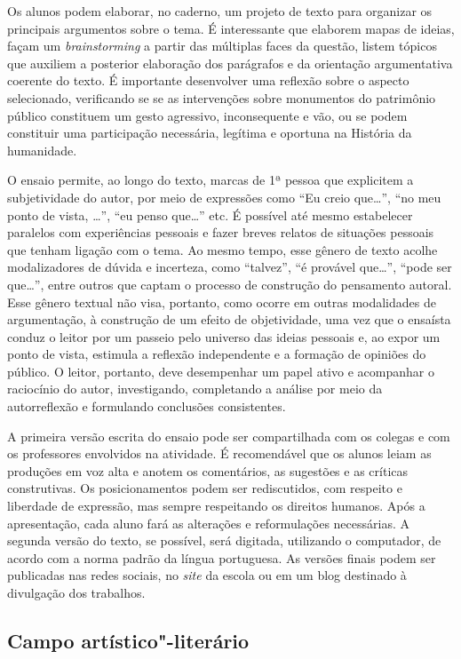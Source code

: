 \documentclass[11pt]{extarticle}
\begin{document}
Os alunos podem elaborar, no caderno, um projeto de texto para organizar
os principais argumentos sobre o tema. É interessante que elaborem mapas
de ideias, façam um \emph{brainstorming} a partir das múltiplas faces da
questão, listem tópicos que auxiliem a posterior elaboração dos
parágrafos e da orientação argumentativa coerente do texto. É importante
desenvolver uma reflexão sobre o aspecto selecionado, verificando se se
as intervenções sobre monumentos do patrimônio público constituem um
gesto agressivo, inconsequente e vão, ou se podem constituir uma
participação necessária, legítima e oportuna na História da humanidade.

O ensaio permite, ao longo do texto, marcas de 1ª pessoa que explicitem
a subjetividade do autor, por meio de expressões como ``Eu creio
que\ldots{}'', ``no meu ponto de vista, \ldots{}'', ``eu penso que\ldots{}'' etc. É
possível até mesmo estabelecer paralelos com experiências pessoais e
fazer breves relatos de situações pessoais que tenham ligação com o
tema. Ao mesmo tempo, esse gênero de texto acolhe modalizadores de
dúvida e incerteza, como ``talvez'', ``é provável que\ldots{}'', ``pode ser
que\ldots{}'', entre outros que captam o processo de construção do pensamento
autoral. Esse gênero textual não visa, portanto, como ocorre em outras
modalidades de argumentação, à construção de um efeito de objetividade,
uma vez que o ensaísta conduz o leitor por um passeio pelo universo das
ideias pessoais e, ao expor um ponto de vista, estimula a reflexão
independente e a formação de opiniões do público. O leitor, portanto,
deve desempenhar um papel ativo e acompanhar o raciocínio do autor,
investigando, completando a análise por meio da autorreflexão e
formulando conclusões consistentes.

A primeira versão escrita do ensaio pode ser compartilhada com os
colegas e com os professores envolvidos na atividade. É recomendável que
os alunos leiam as produções em voz alta e anotem os comentários, as
sugestões e as críticas construtivas. Os posicionamentos podem ser
rediscutidos, com respeito e liberdade de expressão, mas sempre
respeitando os direitos humanos. Após a apresentação, cada aluno fará as
alterações e reformulações necessárias. A segunda versão do texto, se possível, 
será digitada, utilizando o computador, de acordo com a norma padrão da
língua portuguesa. As versões finais podem ser publicadas nas redes
sociais, no \emph{site} da escola ou em um blog destinado à divulgação
dos trabalhos.

\subsection{Campo artístico"-literário}
\end{document}
